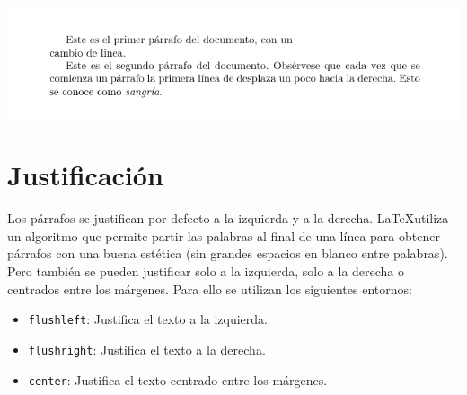 \documentclass[
  letterpaper,
  DIV=11,
  numbers=noendperiod]{scrreport}
\providecommand{\tightlist}{%
  \setlength{\itemsep}{0pt}\setlength{\parskip}{0pt}}\usepackage{longtable,booktabs,array}
\begin{document}
\begin{tcolorbox}[enhanced jigsaw, arc=.35mm, toprule=.15mm, opacitybacktitle=0.6, colback=white, coltitle=black, colbacktitle=quarto-callout-note-color!10!white, breakable, colframe=quarto-callout-note-color-frame, left=2mm, opacityback=0, bottomtitle=1mm, toptitle=1mm, titlerule=0mm, title={Salida}, bottomrule=.15mm, leftrule=.75mm, rightrule=.15mm]
\includegraphics{./img/secciones/parrafos.png}
\end{tcolorbox}

\hypertarget{justificaciuxf3n}{%
\section{Justificación}\label{justificaciuxf3n}}

Los párrafos se justifican por defecto a la izquierda y a la derecha.
\LaTeX utiliza un algoritmo que permite partir las palabras al final
de una línea para obtener párrafos con una buena estética (sin grandes
espacios en blanco entre palabras). Pero también se pueden justificar
solo a la izquierda, solo a la derecha o centrados entre los márgenes.
Para ello se utilizan los siguientes entornos:

\begin{itemize}
\tightlist
\item
  \texttt{flushleft}: Justifica el texto a la izquierda.
\item
  \texttt{flushright}: Justifica el texto a la derecha.
\item
  \texttt{center}: Justifica el texto centrado entre los márgenes.
\end{itemize}
\end{document}
